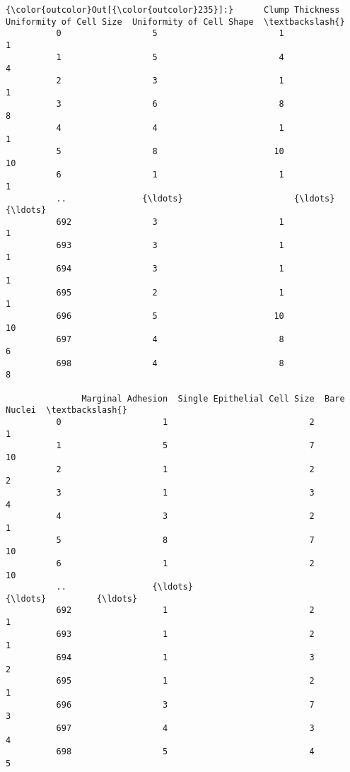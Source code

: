 \documentclass[11pt]{article}
\begin{document}
\begin{Verbatim}[commandchars=\\\{\}]
{\color{outcolor}Out[{\color{outcolor}235}]:}      Clump Thickness  Uniformity of Cell Size  Uniformity of Cell Shape  \textbackslash{}
          0                  5                        1                         1   
          1                  5                        4                         4   
          2                  3                        1                         1   
          3                  6                        8                         8   
          4                  4                        1                         1   
          5                  8                       10                        10   
          6                  1                        1                         1   
          ..               {\ldots}                      {\ldots}                       {\ldots}   
          692                3                        1                         1   
          693                3                        1                         1   
          694                3                        1                         1   
          695                2                        1                         1   
          696                5                       10                        10   
          697                4                        8                         6   
          698                4                        8                         8   
          
               Marginal Adhesion  Single Epithelial Cell Size  Bare Nuclei  \textbackslash{}
          0                    1                            2            1   
          1                    5                            7           10   
          2                    1                            2            2   
          3                    1                            3            4   
          4                    3                            2            1   
          5                    8                            7           10   
          6                    1                            2           10   
          ..                 {\ldots}                          {\ldots}          {\ldots}   
          692                  1                            2            1   
          693                  1                            2            1   
          694                  1                            3            2   
          695                  1                            2            1   
          696                  3                            7            3   
          697                  4                            3            4   
          698                  5                            4            5   
          

\end{Verbatim}
\end{document}
